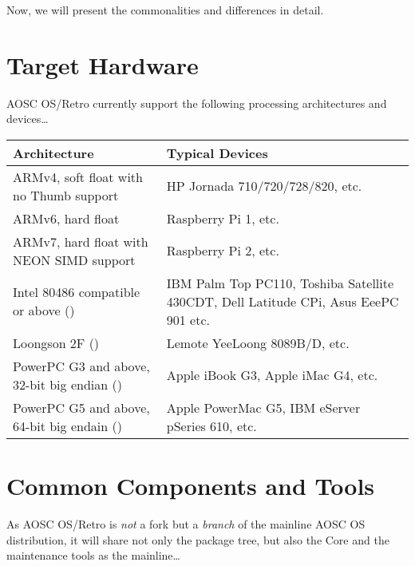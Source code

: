 \documentclass[a5paper,twosided,11pt]{book}
\begin{document}
    Now, we will present the commonalities and differences in detail.




    \section{Target Hardware}
    
    AOSC OS/Retro currently support the following processing architectures and devices\ldots
    \pagebreak

    \begin{tabu} {XX}
        \hline
        {Architecture} &
        {Typical Devices}\\
        \hline
        {ARMv4, soft float with no Thumb support}
            & {HP Jornada 710/720/728/820, etc.}\\
        {ARMv6, hard float}
            & {Raspberry Pi 1, etc.}\\
        {ARMv7, hard float with NEON SIMD support}
            & {Raspberry Pi 2, etc.}\\
        {Intel 80486 compatible or above ()}
            & {IBM Palm Top PC110, Toshiba Satellite 430CDT, Dell Latitude CPi, Asus EeePC 901 etc.}\\
        {Loongson 2F ()}
            & {Lemote YeeLoong 8089B/D, etc.}\\
        {PowerPC G3 and above, 32-bit big endian ()}
            & {Apple iBook G3, Apple iMac G4, etc.}\\
        {PowerPC G5 and above, 64-bit big endain ()}
            & {Apple PowerMac G5, IBM eServer pSeries 610, etc.}\\
        \hline
    \end{tabu}

    \section{Common Components and Tools}
    
    As AOSC OS/Retro is \textit{not} a fork but a \textit{branch} of the mainline AOSC OS distribution,
    it will share not only the package tree, but also the Core and the maintenance tools as the mainline\ldots
    
\end{document}
